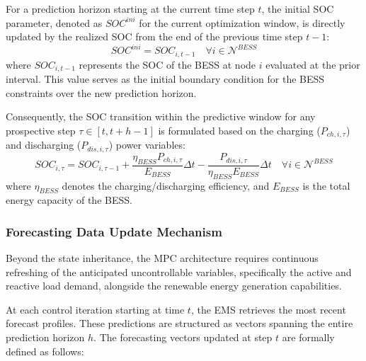 For a prediction horizon starting at the current time step $t$, the initial SOC parameter, denoted as $SOC^{ini}$ for the current optimization window, is directly updated by the realized SOC from the end of the previous time step $t-1$:
\begin{equation} \label{eq:SOC_ini}
    SOC^{ini} = SOC_{i,t-1} \quad \forall i \in \mathcal{N}^{BESS}
\end{equation}
where $SOC_{i,t-1}$ represents the SOC of the BESS at node $i$ evaluated at the prior interval. This value serves as the initial boundary condition for the BESS constraints over the new prediction horizon. 

Consequently, the SOC transition within the predictive window for any prospective step $\tau \in [t, t+h-1]$ is formulated based on the charging ($P_{ch,i,\tau}$) and discharging ($P_{dis,i,\tau}$) power variables:
\begin{equation} \label{eq:SOC_transition}
    SOC_{i,\tau} = SOC_{i,\tau-1} + \frac{\eta_{BESS} P_{ch,i,\tau}}{E_{BESS}} \Delta t - \frac{P_{dis,i,\tau}}{\eta_{BESS} E_{BESS}} \Delta t \quad \forall i \in \mathcal{N}^{BESS}
\end{equation}
where $\eta_{BESS}$ denotes the charging/discharging efficiency, and $E_{BESS}$ is the total energy capacity of the BESS.

\subsubsection{Forecasting Data Update Mechanism}

Beyond the state inheritance, the MPC architecture requires continuous refreshing of the anticipated uncontrollable variables, specifically the active and reactive load demand, alongside the renewable energy generation capabilities.

At each control iteration starting at time $t$, the EMS retrieves the most recent forecast profiles. These predictions are structured as vectors spanning the entire prediction horizon $h$. The forecasting vectors updated at step $t$ are formally defined as follows:

